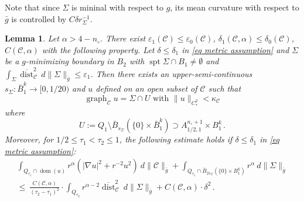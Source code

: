 \documentclass[11pt, letterpaper, reqno]{amsart}
\numberwithin{equation}{section}
\newtheorem{Lem}[Def]{Lemma}
\theoremstyle{remark}
\newcommand{\cC}{\mathcal{C}}
\newcommand{\supp}{\operatorname{spt}}
\newcommand{\graph}{\operatorname{graph}}
\newcommand{\dist}{\operatorname{dist}}
\newcommand{\Sdist}{\overline{\dist}}
\DeclareMathOperator{\Dom}{dom}
\newcommand{\eps}{\varepsilon}
\begin{document}
   Note that since $\Sigma$ is mininal with respect to $g$, its mean curvature with respect to $\bar g$ is controlled by $C\delta r^{-1}_\Sigma$.

   
   \begin{Lem} \label{Lem_Noncon_Maximal graphical region}
     Let $\alpha > 4-n_\circ$. There exist $\eps_1(\cC)\leq \eps_0(\cC)$, $\delta_1(\cC, \alpha)\leq \delta_0(\cC)$, $C(\cC, \alpha)$ with the following property. Let $\delta \leq \delta_1$ in \eqref{eq metric assumption} and $\Sigma$ be a $g$-minimizing boundary in $B_2$ with $\supp \Sigma \cap B_{1} \neq \emptyset$ and $\int_{\Sigma}\Sdist_\cC^2\, d\|\Sigma\|_{\bar g} \leq \eps_1$. Then there exists an upper-semi-continuous $s_\Sigma: \bar B_1^k \to [0, 1/20)$ and $u$ defined on an open subset of $\cC$ such that
     \[ \graph_\cC u = \Sigma \cap U \text{ with } \|u\|_{C^2_*} < \kappa_\cC \]
     where
     \[
       U := Q_1\setminus \bar{B}_{s_\Sigma}(\{0\}\times \bar{B}_1^k) \supset A_{1/2, 1}^{n_\circ+1} \times B_1^k \,.
     \]
     Moreover, for $1/2 \leq \tau_1 < \tau_2 \leq 1$, the following estimate holds if $\delta\leq \delta_1$ in \eqref{eq metric assumption}:
     \[
     \begin{split}
        \int_{Q_{\tau_1} \cap \Dom(u)} r^\alpha (|\nabla u|^2 + r^{-2}u^2)\ d\|\cC\|_{\bar g} + \int_{Q_{\tau_1} \cap\bar{B}_{2s_\Sigma}(\{0\}\times B_1^k)}r^\alpha\ d\|\Sigma\|_{\bar g} 
       \\ \leq\ \frac{C(\cC, \alpha)}{(\tau_2-\tau_1)^2} \cdot \int_{Q_{\tau_2}} r^{\alpha-2}\Sdist_\cC^2 \ d\|\Sigma\|_{\bar g} + C(\cC,\alpha) \cdot \delta^2 \,. 
     \end{split}
     \]
   \end{Lem}
\end{document}
